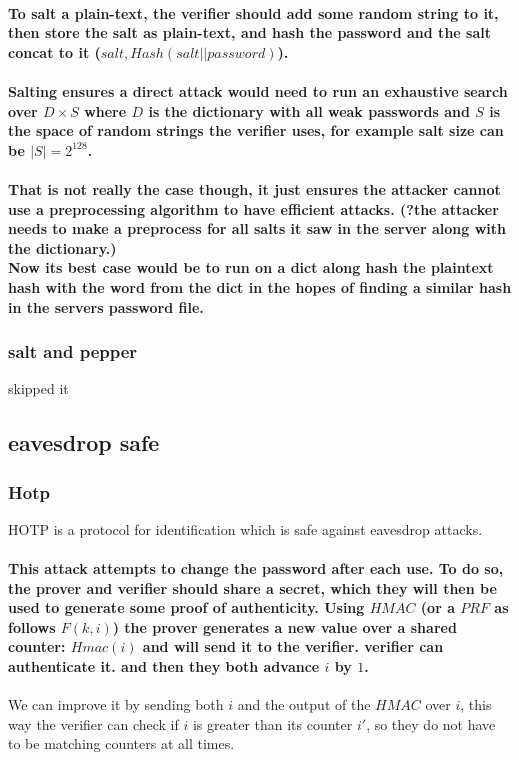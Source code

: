 \paragraph{To salt a plain-text, the verifier should add some random string
to it, then store the salt as plain-text, and hash the password and
the salt concat to it ($salt,Hash\left(salt||password\right)$).}

\paragraph{Salting ensures a direct attack would need to run an exhaustive search
over $D\times S$ where $D$ is the dictionary with all weak passwords
and $S$ is the space of random strings the verifier uses, for example
salt size can be $|S|=2^{128}$. }

\paragraph{That is not really the case though, it just ensures the attacker
cannot use a preprocessing algorithm to have efficient attacks. (?the
attacker needs to make a preprocess for all salts it saw in the server
along with the dictionary.) \protect \\
Now its best case would be to run on a dict along hash the plaintext
hash with the word from the dict in the hopes of finding a similar
hash in the servers password file.}

\subsubsection{salt and pepper}

skipped it

\subsection{eavesdrop safe}

\subsubsection{Hotp}

HOTP is a protocol for identification which is safe against eavesdrop
attacks. 

\paragraph{This attack attempts to change the password after each use. To do
so, the prover and verifier should share a secret, which they will
then be used to generate some proof of authenticity. Using $HMAC$
(or a $PRF$ as follows $F\left(k,i\right)$) the prover generates
a new value over a shared counter: $Hmac\left(i\right)$ and will
send it to the verifier. verifier can authenticate it. and then they
both advance $i$ by $1$. }
\begin{remark}
We can improve it by sending both $i$ and the output of the $HMAC$
over $i$, this way the verifier can check if $i$ is greater than
its counter $i'$, so they do not have to be matching counters at
all times.
\end{remark}

